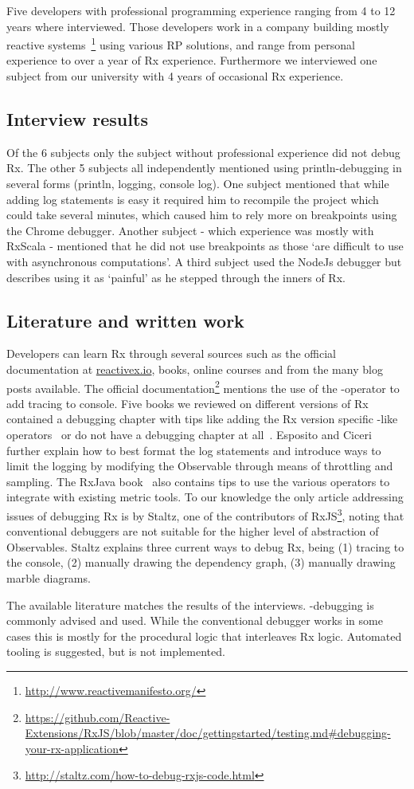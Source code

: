 Five developers with professional programming experience ranging from 4 to 12 years where interviewed. 
Those developers work in a company building mostly reactive systems~\footnote{\url{http://www.reactivemanifesto.org/}} using various RP solutions,
and range from personal experience to over a year of Rx experience.
Furthermore we interviewed one subject from our university with 4 years of occasional Rx experience.

\subsection{Interview results}
Of the 6 subjects only the subject without professional experience did not debug Rx. 
The other 5 subjects all independently mentioned using println-debugging in several forms (println, logging, console log).
One subject mentioned that while adding log statements is easy it required him to recompile the project which could take several minutes, 
which caused him to rely more on breakpoints using the Chrome debugger.
Another subject - which experience was mostly with RxScala - mentioned that he did not use breakpoints as those `are difficult to use with asynchronous computations'.
A third subject used the NodeJs debugger but describes using it as `painful' as he stepped through the inners of Rx.


\subsection{Literature and written work}
Developers can learn Rx through several sources such as the official documentation at \href{http://reactivex.io}{reactivex.io}, books, online courses and from the many blog posts available. The official documentation\footnote{
	\url{https://github.com/Reactive-Extensions/RxJS/blob/master/doc/gettingstarted/testing.md\#debugging-your-rx-application}
} mentions the use of the -operator to add tracing to console. Five books we reviewed on different versions of Rx contained a debugging chapter with tips like adding the Rx version specific -like operators~\cite{esposito2016reactive,rxjavabook2016} or do not have a debugging chapter at all~\cite{introtorx, rxjavabook2015, rxswiftbook2017}. Esposito and Ciceri~\cite{esposito2016reactive} further explain how to best format the log statements and introduce ways to limit the logging by modifying the Observable through means of throttling and sampling. The RxJava book~\cite{rxjavabook2016} also contains tips to use the various  operators to integrate with existing metric tools.
To our knowledge the only article addressing issues of debugging Rx is by Staltz, one of the contributors of RxJS\footnote{\url{http://staltz.com/how-to-debug-rxjs-code.html}}, noting that conventional debuggers are not suitable for the higher level of abstraction of Observables. Staltz explains three current ways to debug Rx, being (1) tracing to the console, (2) manually drawing the dependency graph, (3) manually drawing marble diagrams.

The available literature matches the results of the interviews. -debugging is commonly advised and used. While the conventional debugger works in some cases this is mostly for the procedural logic that interleaves Rx logic. Automated tooling is suggested, but is not implemented.  
